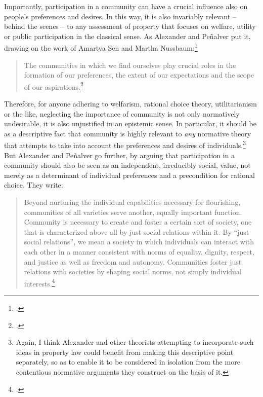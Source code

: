 Importantly, participation in a community can have a crucial influence also on people's preferences and desires. In this way, it is also invariably relevant -- behind the scenes -- to any assessment of property that focuses on welfare, utility or public participation in the classical sense. As Alexander and Pe\~{n}alver put it, drawing on the work of Amartya Sen and Martha Nussbaum:\footcite{sen84,sen85,sen99,nussbaum00,nussbaum02}
\begin{quote}
The communities in which we find ourselves play crucial roles in the formation of our preferences, the extent of our expectations and the scope of our aspirations.\footcite[140]{alexander09}
\end{quote}
Therefore, for anyone adhering to welfarism, rational choice theory, utilitarianism or the like, neglecting the importance of community is not only normatively undesirable, it is also unjustified in an epistemic sense. In particular, it should be  as a descriptive fact that community is highly relevant to {\it any} normative theory that attempts to take into account the preferences and desires of individuals.\footnote{Again, I think Alexander and other theorists attempting to incorporate such ideas in property law could benefit from making this descriptive point separately, so as to enable it to be considered in isolation from the more contentious normative arguments they construct on the basis of it.} But Alexander and Pe\~{n}alver go further, by arguing that participation in a community should also be seen as an independent, irreducibly social, value, not merely as a determinant of individual preferences and a precondition for rational choice. They write:

\begin{quote}
Beyond nurturing the individual capabilities necessary for flourishing, communities of all varieties serve another, equally important function. Community is necessary to create and foster a certain sort of society, one that is characterized above all by just social relations within it. By ``just social relations'', we mean a society in which individuals can interact with each other in a manner consistent with norms of equality, dignity, respect, and justice as well as freedom and autonomy. Communities foster just relations with societies by shaping social norms, not simply individual interests.\footcite[140]{alexander09}
\end{quote}

